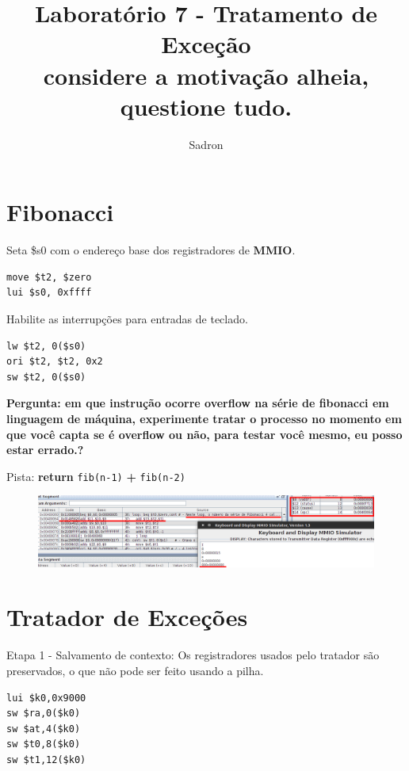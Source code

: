 \documentclass{article}
\author{Sadron}
\title{Laboratório 7 - Tratamento de Exceção\\ \small{considere a motivação 
alheia, questione tudo.}}
\begin{document}
\maketitle

\section{Fibonacci}

Seta \$s0 com o endereço base dos registradores de \textbf{MMIO}.

\begin{verbatim}
move $t2, $zero
lui $s0, 0xffff
\end{verbatim}

Habilite as interrupções para entradas de teclado.

\begin{verbatim}
lw $t2, 0($s0)
ori $t2, $t2, 0x2
sw $t2, 0($s0)
\end{verbatim}

\pagebreak
{\bfseries Pergunta: em que instrução ocorre overflow na série de fibonacci em 
linguagem de máquina, experimente tratar o processo no momento em que você 
capta se é overflow ou não, para testar você mesmo, eu posso estar errado.?}

\begin{center}
Pista: \textbf{return} \verb|fib(n-1)| {\Huge\textbf{\color{Red} +}} 
\verb|fib(n-2)|
\end{center}

\begin{figure}[ht!]
\centering
\includegraphics[scale=0.4]{overflow}
\end{figure}

\section{Tratador de Exceções}

Etapa 1 - Salvamento de contexto: Os registradores usados pelo tratador são
preservados, o que não pode ser feito usando a pilha.

\begin{verbatim}
lui $k0,0x9000
sw $ra,0($k0)
sw $at,4($k0)
sw $t0,8($k0)
sw $t1,12($k0)
\end{verbatim}
\end{document}
